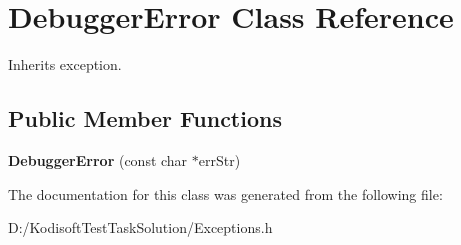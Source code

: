 \hypertarget{class_debugger_error}{\section{Debugger\+Error Class Reference}
\label{class_debugger_error}
}


Inherits exception.

\subsection*{Public Member Functions}
\begin{DoxyCompactItemize}
\item 
\hypertarget{class_debugger_error_aea0374693a6f5aa567db12a53ed4ebd3}{{\bfseries Debugger\+Error} (const char $\ast$err\+Str)}\label{class_debugger_error_aea0374693a6f5aa567db12a53ed4ebd3}

\end{DoxyCompactItemize}


The documentation for this class was generated from the following file\+:\begin{DoxyCompactItemize}
\item 
D\+:/\+Kodisoft\+Test\+Task\+Solution/Exceptions.\+h\end{DoxyCompactItemize}
